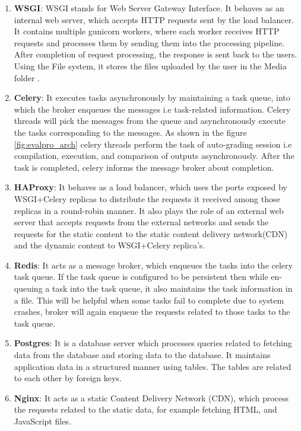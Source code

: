\documentclass{iitbreport}
\begin{document}
\begin{enumerate}
\item {\textbf{WSGI}}: WSGI stands for Web Server Gateway Interface. It behaves as an internal web server, which accepts HTTP requests sent by the load balancer. It contains multiple gunicorn workers, where each worker receives HTTP requests and processes them by sending them into the processing pipeline. After completion of request processing, the response is sent back to the users. Using the File system, it stores the files uploaded by the user in the Media folder .
\item {\textbf{Celery}}:  It executes tasks asynchronously by maintaining a task queue, into which the broker enqueues the messages i.e task-related information. Celery threads will pick the messages from the queue and asynchronously execute the tasks corresponding to the messages. As shown in the figure \ref{fig:evalpro_arch}  celery threads perform the task of auto-grading session i.e compilation, execution, and comparison of outputs asynchronously. After the task is completed, celery informs the message broker about completion.
\item {\textbf{HAProxy}}:  It behaves as a load balancer, which uses the ports exposed by WSGI+Celery replicas to distribute the requests it received among those replicas in a round-robin manner. It also plays the role of an external web server that accepts requests from the external networks and sends the requests for the static content to the static content delivery network(CDN) and the dynamic content to WSGI+Celery replica’s.
\item {\textbf{Redis}}: It acts as a message broker, which enqueues the tasks into the celery task queue. If the task queue is configured to be persistent then while en-queuing a task into the task queue, it also maintains the task information in a file. This will be helpful when some tasks fail to complete due to system crashes, broker will again enqueue the requests related to those tasks to the task queue.
\item {\textbf{Postgres}}:  It is a database server which processes queries related to fetching data from the database and storing data to the database. It maintains application data in a structured manner using tables. The tables are related to each other by foreign keys.
\item {\textbf{Nginx}}: It acts as a static Content Delivery Network (CDN), which process the requests related to the static data, for example fetching HTML, and JavaScript files.

\end{enumerate}
\end{document}
